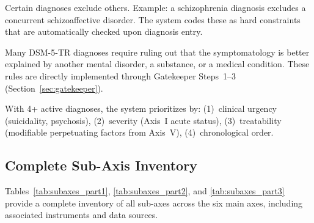 \documentclass[11pt,a4paper]{article}
\begin{document}
\begin{description}[style=nextline, leftmargin=1.5cm, font=\bfseries]
\item[Hierarchical Exclusion Rules] Certain diagnoses exclude others. Example: a schizophrenia diagnosis excludes a concurrent schizoaffective disorder. The system codes these as hard constraints that are automatically checked upon diagnosis entry.
\item[``Due to Another Condition'' Rules] Many DSM-5-TR diagnoses require ruling out that the symptomatology is better explained by another mental disorder, a substance, or a medical condition. These rules are directly implemented through Gatekeeper Steps~1--3 (Section~\ref{sec:gatekeeper}).
\item[Permitted Comorbidities with Prioritization] With 4+ active diagnoses, the system prioritizes by: (1)~clinical urgency (suicidality, psychosis), (2)~severity (Axis~I acute status), (3)~treatability (modifiable perpetuating factors from Axis~V), (4)~chronological order.
\end{description}

\clearpage
\subsection{Complete Sub-Axis Inventory}

Tables~\ref{tab:subaxes_part1}, \ref{tab:subaxes_part2}, and \ref{tab:subaxes_part3} provide a complete inventory of all sub-axes across the six main axes, including associated instruments and data sources.
\end{document}
